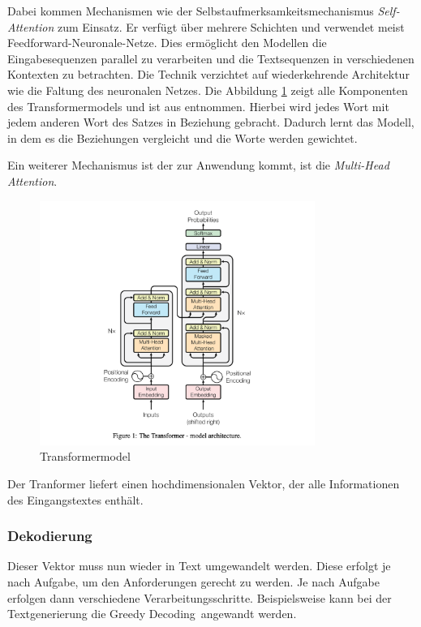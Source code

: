 Dabei kommen Mechanismen wie der Selbstaufmerksamkeitsmechanismus \textit{Self-Attention} zum Einsatz. Er verfügt über mehrere Schichten und verwendet meist Feedforward-Neuronale-Netze. Dies ermöglicht den Modellen die Eingabesequenzen parallel zu verarbeiten und die Textsequenzen in verschiedenen Kontexten zu betrachten. Die Technik verzichtet auf wiederkehrende Architektur wie die Faltung des neuronalen Netzes. Die Abbildung \ref{img:llm_transformer_model} zeigt alle Komponenten des Transformermodels und ist aus \cite{vaswani-2017} entnommen. Hierbei wird jedes Wort mit jedem anderen Wort des Satzes in Beziehung gebracht. Dadurch lernt das Modell, in dem es die Beziehungen vergleicht und die Worte werden gewichtet.\vspace{0.2cm}

Ein weiterer Mechanismus ist der zur Anwendung kommt, ist die \textit{Multi-Head Attention}.

\begin{center}
	\begin{figure}[!ht]
		\includegraphics[width=0.8\textwidth]{content/chapter_basics/images/llm_transformer_model.png}
		\centering
		\caption{Transformermodel}
		\label{img:llm_transformer_model}
	\end{figure}
\end{center}

Der Tranformer liefert einen hochdimensionalen Vektor, der alle Informationen des Eingangstextes enthält.


\subsubsection{Dekodierung}
Dieser Vektor muss nun wieder in Text umgewandelt werden. Diese erfolgt je nach Aufgabe, um den Anforderungen gerecht zu werden. Je nach Aufgabe erfolgen dann verschiedene Verarbeitungsschritte. Beispielsweise kann bei der Textgenerierung die \glqq Greedy Decoding\grqq \ angewandt werden.\vspace{0.2cm}

